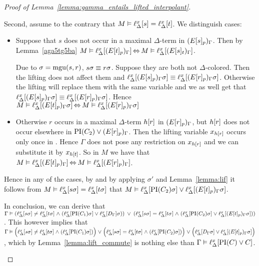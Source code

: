 \begin{proof}[Proof of Lemma~\ref{lemma:gamma_entails_lifted_interpolant}]
\begin{description}
\begin{enumerate}
					Second, assume to the contrary that $M \vDash \ell_{\Delta}^{x}[s] = \ell_{\Delta}^{x}[t]$.
					We distinguish cases:
					\begin{itemize}
						\item
							Suppose that $s$ does not occur in a maximal $\Delta$-term in $(E{[s]_{p}})_\Gamma$.
							Then by Lemma~\ref{aga5tg5ba} $M\vDash \ell_{\Delta}^{x}[(E{[t]_{p}})_\Gamma] \operatorname{\Leftrightarrow} M \vDash \ell_{\Delta}^{x}[(E{[s]_{t}})_\Gamma]$.

							Due to $\sigma=\operatorname{mgu}(s, r)$, $s\sigma \equiv r\sigma$.
							Suppose they are both not $\Delta$-colored.
							Then the lifting does not affect them and 
							$\ell_{\Delta}^{x}[(E{[s]_{p}})_\Gamma\sigma] \equiv \ell_{\Delta}^{x}[(E{[r]_{p}})_\Gamma\sigma]$.
							Otherwise the lifting will replace them with the same variable and we as well get that
							$\ell_{\Delta}^{x}[(E{[s]_{p}})_\Gamma\sigma] \equiv \ell_{\Delta}^{x}[(E{[r]_{p}})_\Gamma\sigma]$.
							Hence $M\vDash \ell_{\Delta}^{x}[(E{[t]_{p}})_\Gamma\sigma] \operatorname{\Leftrightarrow}\allowbreak M\vDash 
							\ell_{\Delta}^{x}[(E{[r]_{p}})_\Gamma\sigma]$

						\item
							Otherwise $r$ occurs in a maximal $\Delta$-term $h[r]$ in $(E{[r]_{p}})_\Gamma$, but $h[r]$ does not occur elsewhere in $\operatorname{PI}(C_2) \lor (E{[r]_{p}})_\Gamma$.
							Then the lifting variable $x_{h[r]}$ occurs only once in \markB{}.
							Hence $\Gamma$ does not pose any restriction on $x_{h[r]}$ and we can substitute it by $x_{h[t]}$. 
							So in $M$ we have that $M\vDash \ell_{\Delta}^{x}[(E{[t]_{p}})_\Gamma] \operatorname{\Leftrightarrow}\allowbreak M\vDash \ell_{\Delta}^{x}[(E{[r]_{p}})_\Gamma]$.

					\end{itemize}

					Hence in any of the cases, by \markB{} and by applying $\sigma'$ and Lemma~\ref{lemma:lif}
					it follows from $M\vDash \ell_{\Delta}^{x}[s\sigma] = \ell_{\Delta}^{x}[t\sigma]$ 
					that $M \vDash \ell_{\Delta}^{x}[\operatorname{PI}(C_2)\sigma] \lor \ell_{\Delta}^{x}[(E{[t]_{p}})_\Gamma\sigma]$. 
					\medskip

					In conclusion, we can derive that 
					$\Gamma \vDash
					(\ell_{\Delta}^{x}[s\sigma] \neq \ell_{\Delta}^{x}[t\sigma] \;{\land}\;\allowbreak (\ell_{\Delta}^{x}[\operatorname{PI}(C_1)\sigma] \lor \ell_{\Delta}^{x}[D_\Gamma]\sigma))
					\;\,{\lor}\;\,\allowbreak
					(\ell_{\Delta}^{x}[s\sigma] = \ell_{\Delta}^{x}[t\sigma] \;{\land}\; (\ell_{\Delta}^{x}[\operatorname{PI}(C_2)\sigma] \lor \ell_{\Delta}^{x}[(E{[t]_{p}})_\Gamma\sigma]))$.
					This however implies that
					$\Gamma \entails
					\Big(\lifdelta{s\sigma} \neq \lifdelta{t\sigma} \spas\land (\lifdelta{\PI(C_1)\sigma} )\Big)
					\spas{\lor}\allowbreak
					\Big(\lifdelta{s\sigma} =\nolinebreak \lifdelta{t\sigma} \spas\land (\lifdelta{\PI(C_2)\sigma}) \Big)
					\spas\lor\allowbreak \Big(\lifdelta{D_\Gamma\sigma} \lor \lifdelta{(E\occat{t}{p})_\Gamma\sigma}\Big)$, 
					which by Lemma~\ref{lemma:lift_commute} is nothing else than
					$\Gamma \vDash \ell_{\Delta}^{x}[\operatorname{PI}(C) \lor C]$.


\end{enumerate}
\end{description}
\end{proof}
